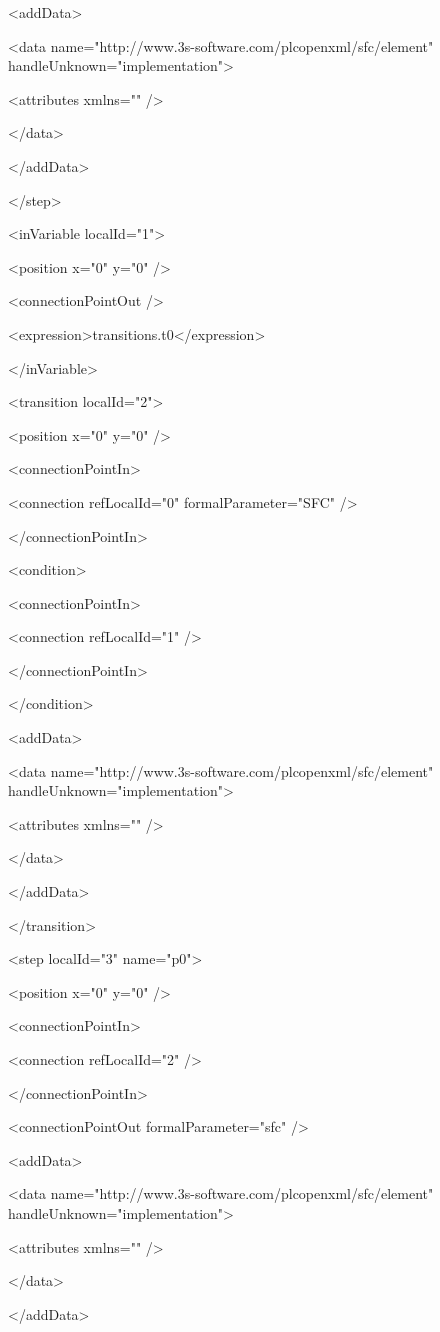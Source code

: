 {  <addData>

   <data name="http://www.3s-software.com/plcopenxml/sfc/element" handleUnknown="implementation">

    <attributes xmlns="" />

   </data>

  </addData>

 </step>

 <inVariable localId="1">

  <position x="0" y="0" />

  <connectionPointOut />

  <expression>transitions.t0</expression>

 </inVariable>

 <transition localId="2">

  <position x="0" y="0" />

  <connectionPointIn>

   <connection refLocalId="0" formalParameter="SFC" />

  </connectionPointIn>

  <condition>

   <connectionPointIn>

    <connection refLocalId="1" />

   </connectionPointIn>

  </condition>

  <addData>

   <data name="http://www.3s-software.com/plcopenxml/sfc/element" handleUnknown="implementation">

    <attributes xmlns="" />

   </data>

  </addData>

 </transition>

 <step localId="3" name="p0">

  <position x="0" y="0" />

  <connectionPointIn>

   <connection refLocalId="2" />

  </connectionPointIn>

  <connectionPointOut formalParameter="sfc" />

  <addData>

   <data name="http://www.3s-software.com/plcopenxml/sfc/element" handleUnknown="implementation">

    <attributes xmlns="" />

   </data>

  </addData>

}
